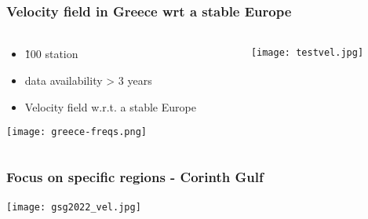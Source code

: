 \begin{frame}
  \frametitle{Velocity field in Greece wrt a stable Europe}
  \framesubtitle{}
  \label{}
  \vskip-1cm
\begin{columns}[T]
  \begin{column}{.3\textwidth}
    \begin{center}
      \begin{itemize}\setlength\itemsep{1em}
        \item \~ 100 station
        \item data availability > 3 years
        \item Velocity field w.r.t. a stable Europe \citep{kreemer14}
      \end{itemize}
      \vskip1cm
      \texttt{[image: greece-freqs.png]}
    \end{center}
  \end{column}
  \begin{column}{.7\textwidth}
    \texttt{[image: testvel.jpg]}
  \end{column}
\end{columns}
\end{frame}
\note{}

\begin{frame}
  \frametitle{Focus on specific regions - Corinth Gulf}
  \framesubtitle{}
  \label{}
  
  \begin{center}
    \texttt{[image: gsg2022\_vel.jpg]}  
  \end{center}

\end{frame}
\note{}

